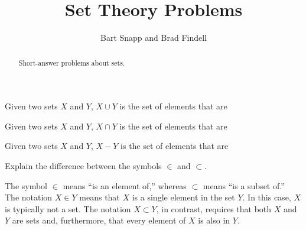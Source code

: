 \documentclass[nooutcomes]{ximera}
\title{Set Theory Problems}
\author{Bart Snapp and Brad Findell}
\begin{document}
\begin{abstract}
Short-answer problems about sets. 
\end{abstract}
\maketitle

\begin{problem}
Given two sets $X$ and $Y$, $X\cup Y$ is the set of elements that are
\begin{multipleChoice}
\end{multipleChoice}
\end{problem}

\begin{problem}
Given two sets $X$ and $Y$, $X\cap Y$ is the set of elements that are 
\begin{multipleChoice}
\end{multipleChoice}
\end{problem}

\begin{problem}
Given two sets $X$ and $Y$, $X - Y$ is the set of elements that are 
\begin{multipleChoice}
\end{multipleChoice}
\end{problem}

\begin{problem}
Explain the difference between the symbols $\in$ and $\subset$.
\begin{freeResponse}
\begin{hint}
The symbol $\in$ means ``is an element of,'' whereas $\subset$ means ``is a subset of.'' \\
The notation $X \in Y$ means that $X$ is a single element in the set $Y$.  In this case, $X$ is typically not a set.  The notation $X \subset Y$, in contrast, requires that both $X$ and $Y$ are sets and, furthermore, that every element of $X$ is also in $Y$.
\end{hint}
\end{freeResponse}
\end{problem}
\end{document}
